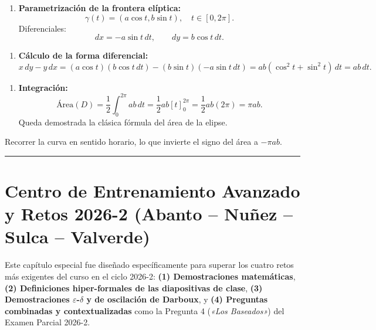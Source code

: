 \documentclass[11pt,a4paper]{article}
\begin{document}
\begin{enumerate}[label=\textbf{\arabic*.}]
\item \textbf{Parametrización de la frontera elíptica:}
\begin{equation*}
\gamma(t) = (a\cos t, b\sin t), \quad t \in [0, 2\pi].
\end{equation*}
Diferenciales:
\begin{equation*}
dx = -a\sin t \, dt, \qquad dy = b\cos t \, dt.
\end{equation*}
\end{enumerate}

\begin{enumerate}[label=\textbf{\arabic*.}]
\item \textbf{Cálculo de la forma diferencial:}
\begin{equation*}
x \, dy - y \, dx = (a\cos t)(b\cos t \, dt) - (b\sin t)(-a\sin t \, dt) = a b (\cos^2 t + \sin^2 t) \, dt = a b \, dt.
\end{equation*}
\end{enumerate}

\begin{enumerate}[label=\textbf{\arabic*.}]
\item \textbf{Integración:}
\begin{equation*}
\text{Área}(D) = \frac{1}{2} \int_0^{2\pi} a b \, dt = \frac{1}{2} a b [t]_0^{2\pi} = \frac{1}{2} a b (2\pi) = \pi a b.
\end{equation*}
Queda demostrada la clásica fórmula del área de la elipse.
\end{enumerate}

\begin{trapbox}
Recorrer la curva en sentido horario, lo que invierte el signo del área a $-\pi ab$.
\end{trapbox}

\vspace{0.5cm}
\hrule
\vspace{0.5cm}

\newpage
\section{Centro de Entrenamiento Avanzado y Retos 2026-2 (Abanto -- Nuñez -- Sulca -- Valverde)}

Este capítulo especial fue diseñado específicamente para superar los cuatro retos más exigentes del curso en el ciclo 2026-2: \textbf{(1) Demostraciones matemáticas}, \textbf{(2) Definiciones hiper-formales de las diapositivas de clase}, \textbf{(3) Demostraciones $\varepsilon$-$\delta$ y de oscilación de Darboux}, y \textbf{(4) Preguntas combinadas y contextualizadas} como la Pregunta 4 (\textit{«Los Baseados»}) del Examen Parcial 2026-2.
\end{document}

